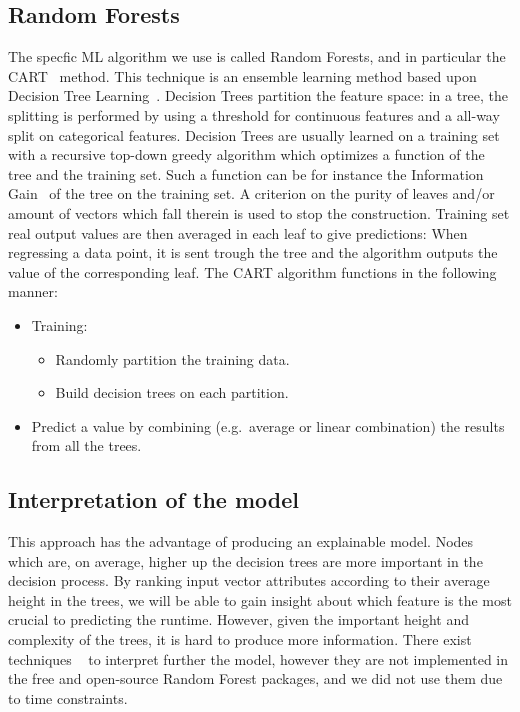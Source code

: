 \documentclass{article}
\begin{document}
\subsection{Random Forests}
\label{sub:random_forests}
The specfic ML algorithm we use is called Random Forests, and in particular the CART~\cite{randomforest} method.
This technique is an ensemble learning method based upon Decision Tree Learning~\cite{decisiontrees}.
Decision Trees partition the feature space: in a tree, the splitting is performed by using a threshold for continuous features and a all-way split on categorical features.
Decision Trees are usually learned on a training set with a recursive top-down greedy algorithm which optimizes a function of the tree and the training set.
Such a function can be for instance the Information Gain~\cite{kullback} of the tree on the training set. A criterion on the purity of leaves and/or amount of vectors which fall therein is used to stop the construction. Training set real output values are then averaged in each leaf to give predictions: When regressing a data point, it is sent trough the tree and the algorithm outputs the value of the corresponding leaf.
The CART algorithm functions in the following manner:
\begin{itemize}
  \item Training: \begin{itemize}
      \item Randomly partition the training data.
      \item Build decision trees on each partition.
    \end{itemize}
  \item Predict a value by combining (e.g.\ average or linear combination) the results from all the trees.
\end{itemize}

\subsection{Interpretation of the model}
\label{sub:explainability}
This approach has the advantage of producing an explainable model.
Nodes which are, on average, higher up the decision trees are more important in the decision process.
By ranking input vector attributes according to their average height in the trees, we will be able to gain insight about which feature is the most crucial to predicting the runtime.
However, given the important height and complexity of the trees, it is hard to produce more information.
There exist techniques ~\cite{interpret} to interpret further the model, however they are not implemented in the free and open-source Random Forest packages, and we did not use them due to time constraints.
\end{document}
